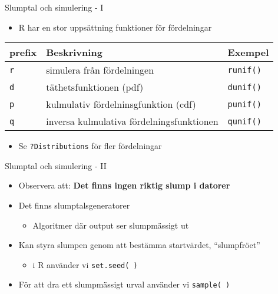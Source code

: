 \documentclass[
  11pt,
  ignorenonframetext,
  handout]{beamer}
\providecommand{\tightlist}{%
  \setlength{\itemsep}{0pt}\setlength{\parskip}{0pt}}
\newcommand\imp[1]{\alert{\textbf{#1}}}
\begin{document}
\begin{frame}[fragile]{Slumptal och simulering - I}
\protect\hypertarget{slumptal-och-simulering---i}{}
\begin{itemize}
\tightlist
\item
  R har en stor uppsättning funktioner för fördelningar
\end{itemize}

\begin{longtable}[]{@{}lll@{}}
\toprule
prefix & Beskrivning & Exempel \\
\midrule
\endhead
\texttt{r} & simulera från fördelningen & \texttt{runif()} \\
\texttt{d} & täthetsfunktionen (pdf) & \texttt{dunif()} \\
\texttt{p} & kulmulativ fördelninsgfunktion (cdf) & \texttt{punif()} \\
\texttt{q} & inversa kulmulativa fördelningsfunktionen &
\texttt{qunif()} \\
\bottomrule
\end{longtable}

\begin{itemize}
\tightlist
\item
  Se \texttt{?Distributions} för fler fördelningar
\end{itemize}
\end{frame}

\begin{frame}{Slumptal och simulering - II}
\protect\hypertarget{slumptal-och-simulering---ii}{}
\begin{itemize}
\tightlist
\item
  Observera att: \imp{Det finns ingen riktig slump i datorer}
\item
  Det finns slumptalsgeneratorer

  \begin{itemize}
  \tightlist
  \item
    Algoritmer där output ser slumpmässigt ut
  \end{itemize}
\item
  Kan styra slumpen genom att bestämma startvärdet, ``slumpfröet''

  \begin{itemize}
  \tightlist
  \item
    i R använder vi \texttt{set.seed( )}
  \end{itemize}
\item
  För att dra ett slumpmässigt urval använder vi \texttt{sample( )}
\end{itemize}
\end{frame}
\end{document}
